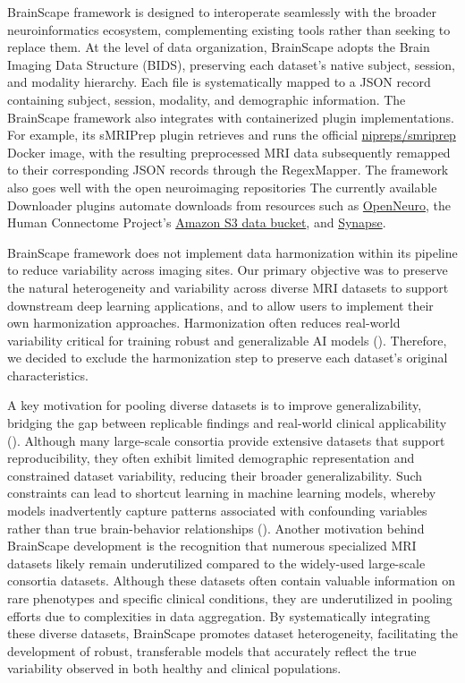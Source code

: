 BrainScape framework is designed to interoperate seamlessly with the broader neuroinformatics ecosystem, 
complementing existing tools rather than seeking to replace them. 
At the level of data organization, BrainScape adopts the Brain Imaging Data Structure (BIDS), 
preserving each dataset's native subject, session, and modality hierarchy. 
Each file is systematically mapped to a JSON record containing subject, session, modality, and demographic information. 
The BrainScape framework also integrates with containerized plugin implementations. 
For example, its sMRIPrep plugin retrieves and runs the official \href{https://www.nipreps.org/smriprep/}{nipreps/smriprep} Docker image, 
with the resulting preprocessed MRI data subsequently remapped to their corresponding JSON records through the RegexMapper. 
The framework also goes well with the open neuroimaging repositories
The currently available Downloader plugins automate downloads from resources such as \href{https://openneuro.org/}{OpenNeuro}, 
the Human Connectome Project's \href{https://wiki.humanconnectome.org/docs/Using%20ConnectomeDB%20data%20on%20Amazon%20S3.html}{Amazon S3 data bucket}, 
and \href{https://www.synapse.org}{Synapse}. 

BrainScape framework does not implement data harmonization within its pipeline to reduce variability across imaging sites. 
Our primary objective was to preserve the natural heterogeneity and variability across diverse MRI datasets to support 
downstream deep learning applications, and to allow users to implement their own harmonization approaches. 
Harmonization often reduces real-world variability critical for training robust and 
generalizable AI models (\cite{adkinson2024brain}).
Therefore, we decided to exclude the harmonization step to preserve each dataset's original characteristics.

A key motivation for pooling diverse datasets is to improve generalizability, 
bridging the gap between replicable findings and real-world clinical applicability 
(\cite{marek2024replicability, adkinson2024brain, yang2024limits}).
Although many large-scale consortia provide extensive datasets that support reproducibility, 
they often exhibit limited demographic representation and constrained dataset variability, 
reducing their broader generalizability. 
Such constraints can lead to shortcut learning in machine learning models, 
whereby models inadvertently capture patterns associated with confounding variables 
rather than true brain-behavior relationships (\cite{marek2024replicability, yang2024limits}). 
Another motivation behind BrainScape development is the recognition that 
numerous specialized MRI datasets likely remain underutilized 
compared to the widely-used large-scale consortia datasets. 
Although these datasets often contain valuable information on rare phenotypes and specific clinical conditions, 
they are underutilized in pooling efforts due to complexities in data aggregation. 
By systematically integrating these diverse datasets, BrainScape promotes 
dataset heterogeneity, facilitating the development of robust, transferable models 
that accurately reflect the true variability observed in both healthy and clinical populations.

